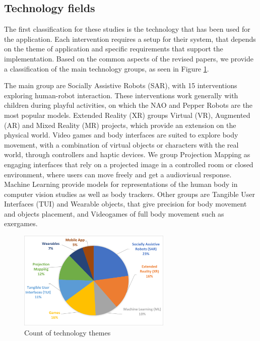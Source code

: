 \documentclass[a4paper,fleqn]{cas-sc}
\begin{document}
\subsection{Technology fields}
\label{sec:tech-fields}
The first classification for these studies is the technology that has been used for the application. Each intervention requires a setup for their system, that depends on the theme of application and specific requirements that support the implementation. Based on the common aspects of the revised papers, we provide a classification of the main technology groups, as seen in Figure \ref{fig:tech-themes-count}.

The main group are Socially Assistive Robots (SAR), with 15 interventions exploring human-robot interaction. These interventions work generally with children during playful activities, on which the NAO and Pepper Robots are the most popular models. Extended Reality (XR) groups Virtual (VR), Augmented (AR) and Mixed Reality (MR) projects, which provide an extension on the physical world. Video games and body interfaces are suited to explore body movement, with a combination of virtual objects or characters with the real world, through controllers and haptic devices. We group Projection Mapping as engaging interfaces that rely on a projected image in a controlled room or closed environment, where users can move freely and get a audiovisual response. Machine Learning provide models for representations of the human body in computer vision studies as well as body trackers. Other groups are Tangible User Interfaces (TUI) and Wearable objects, that give precision for body movement and objects placement, and Videogames of full body movement such as exergames.

\begin{figure}
	\includegraphics[width=0.65\textwidth]{fig6_tech-themes-general.png}
        \centering
	  \caption{Count of technology themes}\label{fig:tech-themes-count}
\end{figure}
\end{document}
